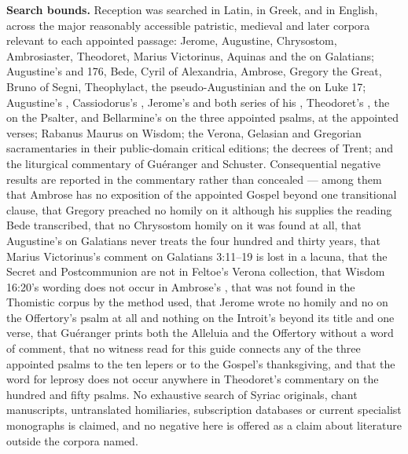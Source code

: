 \textbf{Search bounds.} Reception was searched in Latin, in Greek, and in
English, across the major reasonably accessible patristic, medieval and later
corpora relevant to each appointed passage: Jerome, Augustine, Chrysostom,
Ambrosiaster, Theodoret, Marius Victorinus, Aquinas and the  on Galatians; Augustine's  and
 176, Bede, Cyril of Alexandria, Ambrose, Gregory the Great, Bruno
of Segni, Theophylact, the pseudo-Augustinian  and the  on Luke 17; Augustine's
, Cassiodorus's , Jerome's
 and both series of his , Theodoret's
, the  on the Psalter, and
Bellarmine's  on the three appointed psalms, at the
appointed verses; Rabanus Maurus on Wisdom; the Verona, Gelasian and Gregorian
sacramentaries in their public-domain critical editions; the decrees of Trent;
and the liturgical commentary of Guéranger and Schuster. Consequential negative
results are reported in the commentary rather than concealed --- among them
that Ambrose has no exposition of the appointed Gospel beyond one transitional
clause, that Gregory preached no homily on it although his 
supplies the reading Bede transcribed, that no Chrysostom homily on it was
found at all, that Augustine's  on Galatians never treats the
four hundred and thirty years, that Marius Victorinus's comment on Galatians
3:11--19 is lost in a lacuna, that the Secret and Postcommunion are not in
Feltoe's Verona collection, that Wisdom 16:20's wording does not occur in
Ambrose's , that 
was not found in the Thomistic corpus by the method used, that Jerome wrote no
homily and no  on the Offertory's psalm at all and
nothing on the Introit's beyond its title and one verse, that Guéranger prints
both the Alleluia and the Offertory without a word of comment, that no witness
read for this guide connects any of the three appointed psalms to the ten
lepers or to the Gospel's thanksgiving, and that the word for leprosy does not
occur anywhere in Theodoret's commentary on the hundred and fifty psalms. No
exhaustive search
of Syriac originals, chant manuscripts, untranslated homiliaries, subscription
databases or current specialist monographs is claimed, and no negative here is
offered as a claim about literature outside the corpora named.

